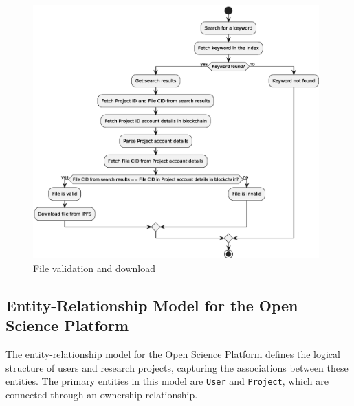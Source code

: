 \documentclass{article}
\begin{document}
\begin{figure}[htbp]
    \centering
    \includegraphics[width=0.98\textwidth, keepaspectratio]{keyword_and_file_validation.eps}
    \caption{File validation and download}
    \label{fig:c4_file_validation}
\end{figure}



\subsection{Entity-Relationship Model for the Open Science Platform}

The entity-relationship model for the Open Science Platform defines the logical structure of users and research projects, capturing the associations between these entities. The primary entities in this model are \texttt{User} and \texttt{Project}, which are connected through an ownership relationship.
\end{document}
